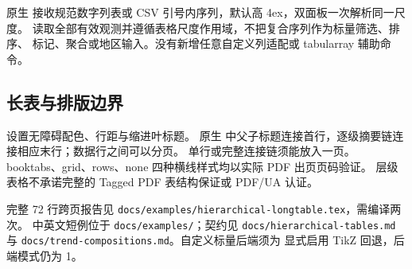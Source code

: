 原生  接收规范数字列表或 CSV 引号内序列，默认高 4ex，双面板一次解析同一尺度。
 读取全部有效观测并遵循表格尺度作用域，不把复合序列作为标量筛选、排序、
标记、聚合或地区输入。没有新增任意自定义列适配或 tabularray 辅助命令。

\subsection{长表与排版边界}
 设置无障碍配色、行距与缩进叶标题。
原生  中父子标题连接首行，逐级摘要链连接相应末行；数据行之间可以分页。
单行或完整连接链须能放入一页。booktabs、grid、rows、none 四种横线样式均以实际 PDF 出页页码验证。
层级表格不承诺完整的 Tagged PDF 表结构保证或 PDF/UA 认证。

完整 72 行跨页报告见 \texttt{docs/examples/hierarchical-longtable.tex}，需编译两次。
中英文短例位于 \texttt{docs/examples/}；契约见 \texttt{docs/hierarchical-tables.md} 与
\texttt{docs/trend-compositions.md}。自定义标量后端须为  显式启用 TikZ 回退，后端模式仍为 1。

